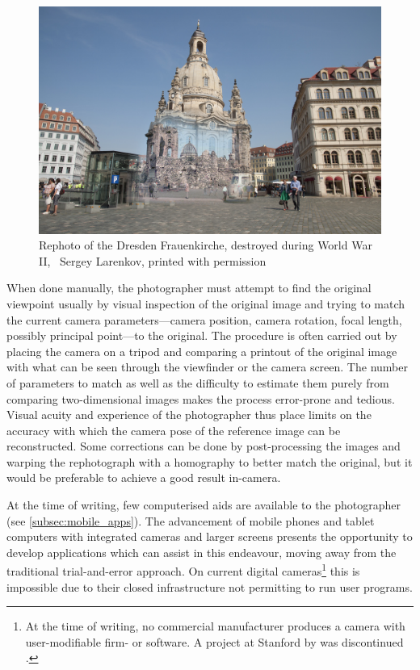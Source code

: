 \begin{figure}
   \includegraphics[width=\textwidth]{gfx/1950_2014_Frauenkirche_small.jpg}
   \caption[Rephoto of Dresden Frauenkirche]{Rephoto of the Dresden Frauenkirche, destroyed during World War II,
   \textcopyright\ Sergey Larenkov, printed with permission}
   \label{fig2}
\end{figure}

When done manually, the photographer must attempt to find the original viewpoint 
usually by visual inspection of the original image and trying to match the
current camera parameters---camera position, camera rotation, focal length,
possibly principal point---to the original.
The procedure is often carried out by placing the camera on a tripod and
comparing a printout of the original image with what can be seen through the
viewfinder or the camera screen. The number of parameters to match as well as
the difficulty to estimate them purely from comparing two-dimensional images makes the process
error-prone and tedious. Visual acuity and experience of the photographer thus
place limits on the accuracy with which the camera pose of the reference image
can be reconstructed. Some corrections can be done by post-processing the images
and warping the rephotograph with a homography to better match the original, but
it would be preferable to achieve a good result in-camera.

At the time of writing, few computerised aids are available to the photographer
(see \autoref{subsec:mobile_apps}).  The advancement of mobile phones and tablet
computers with integrated cameras and larger screens presents the opportunity to
develop applications which can assist in this endeavour, moving away from the
traditional trial-and-error approach.  On current digital cameras\footnote{At
   the time of writing, no commercial manufacturer produces a camera with
   user-modifiable firm- or software. A project at Stanford by \citet{Levoy2010}
was discontinued \citep{FrankenCam}.} this is impossible due to their closed
infrastructure not permitting to run user programs. 

